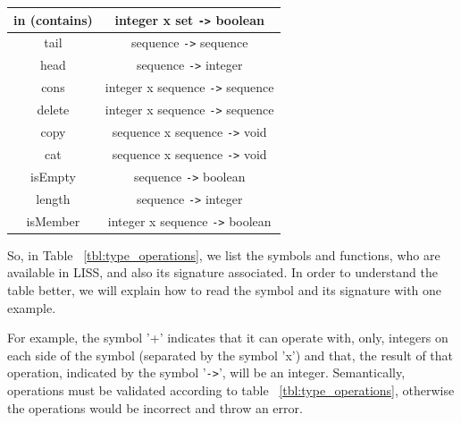 \documentclass[
  oneside,
  11pt, a4paper,
  footinclude=true,
  headinclude=true,
  cleardoublepage=empty
]{scrbook}
\begin{document}
\begin{table}[]
\begin{tabular}{|c|c|}
in (contains)                              & integer x set \verb+->+ boolean                                            \\ \hline
tail                                      & sequence \verb+->+ sequence                                                \\ \hline
head                                      & sequence \verb+->+ integer                                                 \\ \hline
cons                                      & integer x sequence \verb+->+ sequence                                      \\ \hline
delete                                    & integer x sequence \verb+->+ sequence                                      \\ \hline
copy                                      & sequence x sequence \verb+->+ void                                         \\ \hline
cat                                       & sequence x sequence \verb+->+ void                                         \\ \hline
isEmpty                                   & sequence \verb+->+ boolean                                                 \\ \hline
length                                    & sequence \verb+->+ integer                                                 \\ \hline
isMember                                  & integer x sequence \verb+->+ boolean                                       \\ \hline
\end{tabular}
\end{table}

\newpage

So, in Table ~\ref{tbl:type_operations}, we list the symbols and functions, who are available in LISS, and also its signature associated.
In order to understand the table better, we will explain how to read the symbol and its signature with one example.

For example, the symbol '+' indicates that it can operate with, only, integers on each side of the symbol (separated by the symbol 'x') and that, the result of that operation, indicated by the symbol '\verb+->+', will be an integer.
Semantically, operations must be validated according to table ~\ref{tbl:type_operations}, otherwise the operations would be incorrect and throw an error.
\end{document}
